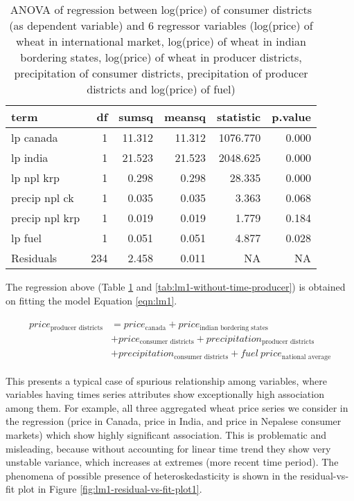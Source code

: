 \documentclass[
  12pt,
]{article}
\begin{document}
\begin{table}[H]

\caption{\label{tab:lm1-without-time-consumer}ANOVA of regression between log(price) of consumer districts (as dependent variable) and 6 regressor variables (log(price) of wheat in international market, log(price) of wheat in indian bordering states, log(price) of wheat in producer districts, precipitation of consumer districts, precipitation of producer districts and log(price) of fuel)}
\centering
\begin{tabular}[t]{>{\raggedright\arraybackslash}p{7em}rrrrr}
\toprule
term & df & sumsq & meansq & statistic & p.value\\
\midrule
lp canada & 1 & 11.312 & 11.312 & 1076.770 & 0.000\\
lp india & 1 & 21.523 & 21.523 & 2048.625 & 0.000\\
lp npl krp & 1 & 0.298 & 0.298 & 28.335 & 0.000\\
precip npl ck & 1 & 0.035 & 0.035 & 3.363 & 0.068\\
precip npl krp & 1 & 0.019 & 0.019 & 1.779 & 0.184\\
\addlinespace
lp fuel & 1 & 0.051 & 0.051 & 4.877 & 0.028\\
Residuals & 234 & 2.458 & 0.011 & NA & NA\\
\bottomrule
\end{tabular}
\end{table}

The regression above (Table \ref{tab:lm1-without-time-consumer} and \ref{tab:lm1-without-time-producer}) is obtained on fitting the model Equation \ref{eqn:lm1}.

\begin{equation}
\label{eqn:lm1}
\begin{aligned}
\begin{split}
price_{\textrm{producer districts}} &= price_{\textrm{canada}} + price_{\textrm{indian bordering states}} \\ &+
price_{\textrm{consumer districts}} + precipitation_{\textrm{producer districts}} \\ &+
precipitation_{\textrm{consumer districts}} + fuel~price_{\textrm{national average}}
\end{split}
\end{aligned}
\end{equation}

This presents a typical case of spurious relationship among variables, where variables having times series attributes show exceptionally high association among them. For example, all three aggregated wheat price series we consider in the regression (price in Canada, price in India, and price in Nepalese consumer markets) which show highly significant association. This is problematic and misleading, because without accounting for linear time trend they show very unstable variance, which increases at extremes (more recent time period). The phenomena of possible presence of heteroskedasticity is shown in the residual-vs-fit plot in Figure \ref{fig:lm1-residual-vs-fit-plot1}.
\end{document}
